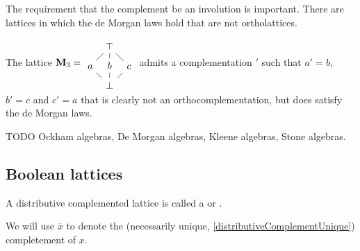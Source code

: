 The requirement that the complement be an involution is important. There are lattices in which the de Morgan laws hold that are not ortholattices.

\begin{example}
The lattice $\mathbf{M}_3 = \begin{tikzcd}[column sep={2em,between origins},row sep={2em,between origins}]
&\top \ar[ld, dash] \ar[d,dash] \ar[rd, dash] &\\ a \ar[rd, dash]& b \ar[d, dash] & c \ar[ld, dash] \\ &\bot &
\end{tikzcd}$ admits a complementation $'$ such that $a' = b$, $b' = c$ and $c' = a$ that is clearly not an orthocomplementation, but does satisfy the de Morgan laws.
\end{example}

TODO Ockham algebras, De Morgan algebras, Kleene algebras, Stone algebras.

\subsection{Boolean lattices}
\begin{definition}
A distributive complemented lattice is called a  or .
\end{definition}
We will use $\overline{x}$ to denote the (necessarily unique, \ref{distributiveComplementUnique}) completement of $x$.

